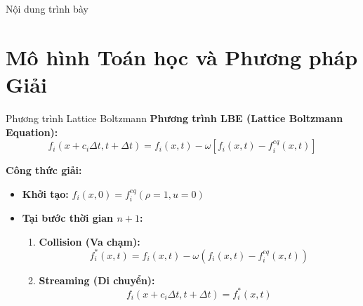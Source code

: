 \documentclass[t, aspectratio=169]{beamer}
\begin{document}
	
	\begin{frame}[allowframebreaks]{Nội dung trình bày}
		\tableofcontents
	\end{frame}
	
	\resetPageCount
	\showPageNumber
	
	\useStyleHustFull
	\useThinBar
	
	\section{Mô hình Toán học và Phương pháp Giải}
	
	\begin{frame}{Phương trình Lattice Boltzmann}
		\textbf{Phương trình LBE (Lattice Boltzmann Equation):}
		\begin{equation}
			f_i(x + c_i \Delta t, t + \Delta t) = f_i(x, t) - \omega[f_i(x, t) - f_i^{eq}(x, t)]
		\end{equation}
		
		\vspace{0.5em}
		
		\textbf{Công thức giải:}
		\begin{itemize}
			\item \textbf{Khởi tạo:} $f_i(x, 0) = f_i^{eq}(\rho=1, u=0)$
			\item \textbf{Tại bước thời gian $n+1$:}
			\begin{enumerate}
				\item \textbf{Collision (Va chạm):} 
				\[f^*_i(x, t) = f_i(x, t) - \omega(f_i(x, t) - f_i^{eq}(x, t))\]
				\item \textbf{Streaming (Di chuyển):} 
				\[f_i(x + c_i \Delta t, t + \Delta t) = f^*_i(x, t)\]
			\end{enumerate}
		\end{itemize}
	\end{frame}
	
\end{document}
